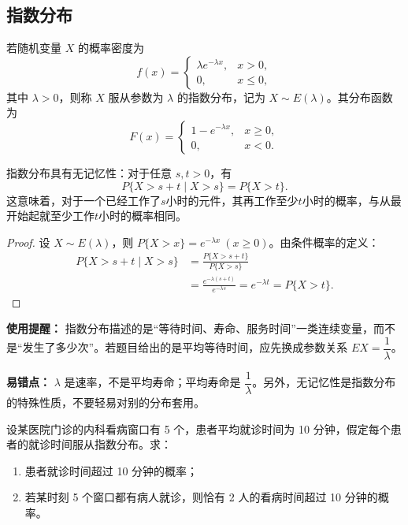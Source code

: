 ﻿\documentclass[lang=cn,11pt]{elegantbook}
\begin{document}
\subsection{指数分布} \label{subsec:exp-dist}
\begin{definition}[指数分布] \label{def:exp-dist}
若随机变量 $X$ 的概率密度为
\[
f(x) = \begin{cases}
\lambda e^{-\lambda x}, & x > 0, \\
0, & x \le 0,
\end{cases}
\]
其中 $\lambda > 0$，则称 $X$ 服从参数为 $\lambda$ 的指数分布，记为 $X \sim E(\lambda)$。其分布函数为
\[
F(x) = \begin{cases}
1 - e^{-\lambda x}, & x \ge 0, \\
0, & x < 0.
\end{cases}
\]
\end{definition}

\begin{property}[无记忆性] \label{prop:memoryless}
指数分布具有无记忆性：对于任意 $s,t > 0$，有
\[
P\{X > s + t \mid X > s\} = P\{X > t\}.
\]
这意味着，对于一个已经工作了$s$小时的元件，其再工作至少$t$小时的概率，与从最开始起就至少工作$t$小时的概率相同。
\end{property}
\begin{proof}
设 \(X \sim E(\lambda)\)，则 \(P\{X > x\} = e^{-\lambda x}\ (x \geq 0)\)。由条件概率的定义：
\begin{align*}
P\{X > s + t \mid X > s\} &= \frac{P\{X > s + t\}}{P\{X > s\}} \\
&= \frac{e^{-\lambda(s+t)}}{e^{-\lambda s}} = e^{-\lambda t} = P\{X > t\}.
\end{align*}
\end{proof}

\begin{note}
\textbf{使用提醒：} 指数分布描述的是“等待时间、寿命、服务时间”一类连续变量，而不是“发生了多少次”。若题目给出的是平均等待时间，应先换成参数关系 \(EX=\dfrac{1}{\lambda}\)。

\textbf{易错点：} \(\lambda\) 是速率，不是平均寿命；平均寿命是 \(\dfrac{1}{\lambda}\)。另外，无记忆性是指数分布的特殊性质，不要轻易对别的分布套用。
\end{note}


\begin{exercise}\label{exer:2-28}
设某医院门诊的内科看病窗口有 5 个，患者平均就诊时间为 10 分钟，假定每个患者的就诊时间服从指数分布。求：
\begin{enumerate}
    \item[(1)] 患者就诊时间超过 10 分钟的概率；
    \item[(2)] 若某时刻 5 个窗口都有病人就诊，则恰有 2 人的看病时间超过 10 分钟的概率。
\end{enumerate}
\end{exercise}
\end{document}

